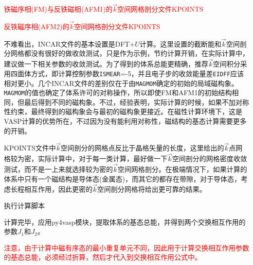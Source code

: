 \textcolor{red}{铁磁序相\textrm{(FM)}与反铁磁相\textrm{(AFM1)}的$\vec k$空间网格剖分文件\textrm{KPOINTS}}

\textcolor{red}{反铁磁序相\textrm{(AFM2)}的$\vec k$空间网格剖分文件\textrm{KPOINTS}}

不难看出，\textrm{INCAR}文件的基本设置是\textrm{DFT}+$U$计算。这里设置的截断能和$\vec k$空间剖分网格都没有很好的做收敛测试，只是作为示例，节约计算开销，在实际计算中，建议做一下相关参数的收敛测试。为了得到的体系总能更精确，推荐$\vec k$空间积分采用四面体方式，即计算控制参数\texttt{ISMEAR}=-5，并且电子步的收敛能量差\texttt{EIDFF}应该相对更小。几个\textrm{INCAR}文件的差别仅在于由\texttt{MAGMOM}确定的初始的局域磁构象。\texttt{MAGMOM}的值也确定了体系许可的对称操作，所以即使\textrm{FM}和\textrm{AFM1}的初始结构相同，但最后得到不同的磁构象。不过，经验表明，实际计算的时候，如果不加对称性约束，最终得到的磁构象会与最初的磁构象更接近。在磁性计算环境下，这是\textrm{VASP}计算的优势所在，不过因为没有能利用对称性，磁结构的基态计算需要更多的开销。


\textrm{KPOINTS}文件中$\vec k$空间剖分的网格点反比于晶格矢量的长度，这里给出的$\vec k$点网格较为密，实际计算中，对于每一类计算，最好做一下$\vec k$空间剖分的网格密度收敛测试，而不是一上来就选择较为密的$\vec k$空间网格剖分。在极端情况下，如果计算的体系中只有一个磁结构是导体态(金属态)，而其它的都存在带隙，对于导体态，考虑长程相互作用，因此更密的$\vec k$空间剖分网格将给出更可靠的结果。

执行计算脚本

计算完毕，应用\textrm{py4vasp}模块，提取体系的基态总能，并得到两个交换相互作用的参数$J_1$和$J_2$。

\textcolor{red}{注意，由于计算中磁有序态的最小重复单元不同，因此用于计算交换相互作用参数的基态总能，必须经过折算，然后才代入到交换相互作用公式中。}

